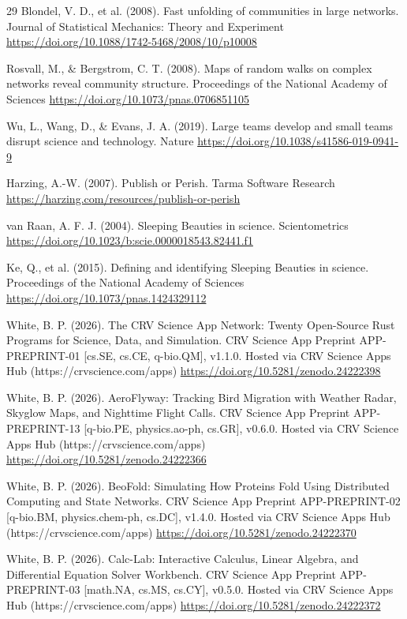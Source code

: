 \documentclass[10pt,letterpaper]{article}
\begin{document}
\begin{thebibliography}{29}
 Blondel, V. D., et al. (2008). Fast unfolding of communities in large networks. Journal of Statistical Mechanics: Theory and Experiment \url{https://doi.org/10.1088/1742-5468/2008/10/p10008}

 Rosvall, M., \& Bergstrom, C. T. (2008). Maps of random walks on complex networks reveal community structure. Proceedings of the National Academy of Sciences \url{https://doi.org/10.1073/pnas.0706851105}

 Wu, L., Wang, D., \& Evans, J. A. (2019). Large teams develop and small teams disrupt science and technology. Nature \url{https://doi.org/10.1038/s41586-019-0941-9}

 Harzing, A.-W. (2007). Publish or Perish. Tarma Software Research \url{https://harzing.com/resources/publish-or-perish}

 van Raan, A. F. J. (2004). Sleeping Beauties in science. Scientometrics \url{https://doi.org/10.1023/b:scie.0000018543.82441.f1}

 Ke, Q., et al. (2015). Defining and identifying Sleeping Beauties in science. Proceedings of the National Academy of Sciences \url{https://doi.org/10.1073/pnas.1424329112}

 White, B. P. (2026). The CRV Science App Network: Twenty Open-Source Rust Programs for Science, Data, and Simulation. CRV Science App Preprint APP-PREPRINT-01 [cs.SE, cs.CE, q-bio.QM], v1.1.0. Hosted via CRV Science Apps Hub (https://crvscience.com/apps) \url{https://doi.org/10.5281/zenodo.24222398}

 White, B. P. (2026). AeroFlyway: Tracking Bird Migration with Weather Radar, Skyglow Maps, and Nighttime Flight Calls. CRV Science App Preprint APP-PREPRINT-13 [q-bio.PE, physics.ao-ph, cs.GR], v0.6.0. Hosted via CRV Science Apps Hub (https://crvscience.com/apps) \url{https://doi.org/10.5281/zenodo.24222366}

 White, B. P. (2026). BeoFold: Simulating How Proteins Fold Using Distributed Computing and State Networks. CRV Science App Preprint APP-PREPRINT-02 [q-bio.BM, physics.chem-ph, cs.DC], v1.4.0. Hosted via CRV Science Apps Hub (https://crvscience.com/apps) \url{https://doi.org/10.5281/zenodo.24222370}

 White, B. P. (2026). Calc-Lab: Interactive Calculus, Linear Algebra, and Differential Equation Solver Workbench. CRV Science App Preprint APP-PREPRINT-03 [math.NA, cs.MS, cs.CY], v0.5.0. Hosted via CRV Science Apps Hub (https://crvscience.com/apps) \url{https://doi.org/10.5281/zenodo.24222372}


\end{thebibliography}
\end{document}
